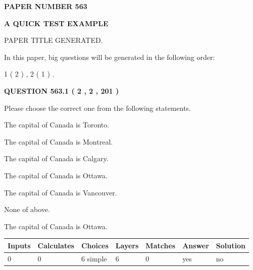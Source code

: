 \documentclass[12pt]{article}
\begin{document}
   
   
   
 {\textbf{ \Large{ PAPER NUMBER  563  }}}
   
   
\vspace{0.2in}
   
   
   
   
   
   
   
   
 \vspace{0.2in}
{\LARGE {\textbf{ A QUICK TEST EXAMPLE}}}
   
   
 PAPER TITLE GENERATED.
   
   
   
\vspace{0.2in}
   
In this paper, big questions will be generated in the following order: 
   
   
   1 ( 2 )
 ,
   2 ( 1 )
 .
  
\vspace{0.2in}
  
{\textbf{\Large{QUESTION
563.1 
 ( 2 , 2 , 201 )
}}}
  
  
Please choose the correct one from the following statements.
 
 
The capital of Canada is Toronto.
 
 
The capital of Canada is Montreal.
 
 
The capital of Canada is Calgary.
 
 
The capital of Canada is Ottawa.
 
 
The capital of Canada is Vancouver.
 
 
 None of above.
 
 
\noindent{}
 
 
The capital of Canada is Ottawa.
 
 
\noindent{}
 
 
   
   
   
   
\noindent\begin{tabular}{|l|l|l|l|l|l|l|}
 \hline
Inputs & Calculates & Choices & Layers & Matches & Answer & Solution \\ \hline
 0  & 
 0  & 
 6
  simple  
  & 
 6  & 
 0  & 
  yes & 
  no 
  \\ \hline
 \end{tabular}
   
\end{document}
